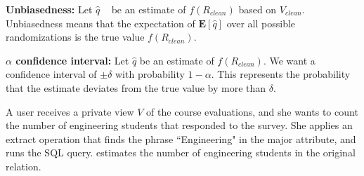 \noindent\textbf{Unbiasedness: } Let $\hat{q}$ ~ be an estimate of $f(R_{clean})$ based on $V_{clean}$. Unbiasedness means that the expectation of $\mathbf{E}[\hat{q}]$ over all possible randomizations is the true value $f(R_{clean})$.

\vspace{0.5em}

\noindent\textbf{$\alpha$ confidence interval: } Let $\hat{q}$ be an estimate of $f(R_{clean})$. We want a confidence interval of $\pm \delta$ with probability $1-\alpha$. This represents the probability that the estimate deviates from the true value by more than $\delta$.

\begin{example}
A user receives a private view $V$ of the course evaluations, and she wants to count the number of engineering students that responded to the survey.  
She applies an extract operation that finds the phrase ``Engineering" in the \textsf{major} attribute, and runs the SQL query.
\sys estimates the number of engineering students in the original relation.
\end{example}

